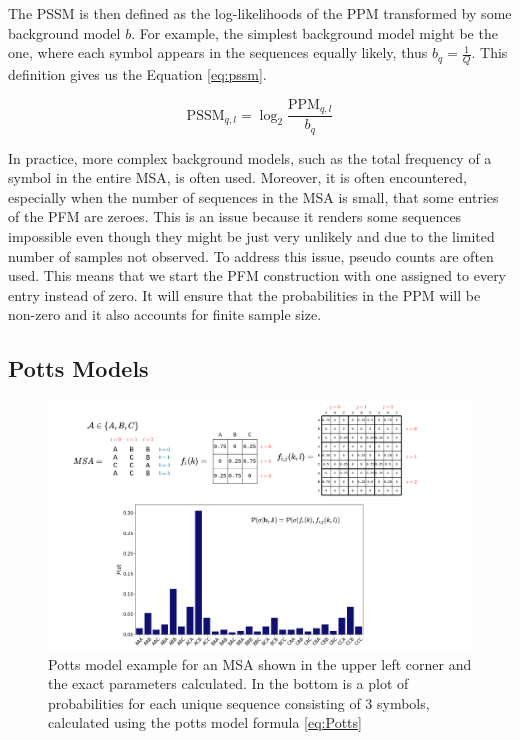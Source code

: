 The PSSM is then defined as the log-likelihoods of the PPM transformed by some background model $b$.
For example, the simplest background model might be the one, where each symbol appears in the sequences equally likely, thus $b_q = \frac{1}{Q}$.
This definition gives us the Equation \ref{eq:pssm}.

\begin{equation}
    \text{PSSM}_{q, l} = \log_2 \frac{\text{PPM}_{q, l}}{b_q}
    \label{eq:pssm}
\end{equation}

In practice, more complex background models, such as the total frequency of a symbol in the entire MSA, is often used.
Moreover, it is often encountered, especially when the number of sequences in the MSA is small, that some entries of the PFM are zeroes.
This is an issue because it renders some sequences impossible even though they might be just very unlikely and due to the limited number of samples not observed.
To address this issue, pseudo counts are often used.
This means that we start the PFM construction with one assigned to every entry instead of zero.
It will ensure that the probabilities in the PPM will be non-zero and it also accounts for finite sample size.

\subsection{Potts Models}

\begin{figure}
    \centering
    \includegraphics[width=\linewidth]{imgs_tomas/potts_example.png}
    \caption{Potts model example for an MSA shown in the upper left corner and the exact parameters calculated. In the bottom is a plot of probabilities for each unique sequence consisting of 3 symbols, calculated using the potts model formula \ref{eq:Potts}}
    \label{fig:potts_example}
\end{figure}

